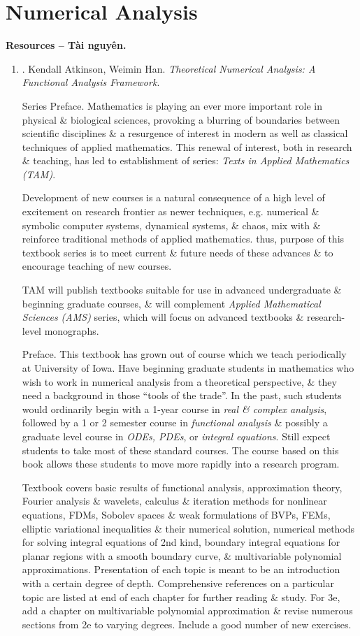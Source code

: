 \documentclass{article}
\begin{document}
\section{Numerical Analysis}
\textbf{\textsf{Resources -- Tài nguyên.}}
\begin{enumerate}
	\item \cite{Atkinson_Han2009}. {\sc Kendall Atkinson, Weimin Han}. {\it Theoretical Numerical Analysis: A Functional Analysis Framework}.
	
	{\sf Series Preface.} Mathematics is playing an ever more important role in physical \& biological sciences, provoking a blurring of boundaries between scientific disciplines \& a resurgence of interest in modern as well as classical techniques of applied mathematics. This renewal of interest, both in research \& teaching, has led to establishment of series: {\it Texts in Applied Mathematics (TAM)}.
	
	Development of new courses is a natural consequence of a high level of excitement on research frontier as newer techniques, e.g. numerical \& symbolic computer systems, dynamical systems, \& chaos, mix with \& reinforce traditional methods of applied mathematics. thus, purpose of this textbook series is to meet current \& future needs of these advances \& to encourage teaching of new courses.
	
	TAM will publish textbooks suitable for use in advanced undergraduate \& beginning graduate courses, \& will complement {\it Applied Mathematical Sciences (AMS)} series, which will focus on advanced textbooks \& research-level monographs.
	
	{\sf Preface.} This textbook has grown out of course which we teach periodically at University of Iowa. Have beginning graduate students in mathematics who wish to work in numerical analysis from a theoretical perspective, \& they need a background in those ``tools of the trade''. In the past, such students would ordinarily begin with a 1-year course in {\it real \& complex analysis}, followed by a 1 or 2 semester course in {\it functional analysis} \& possibly a graduate  level course in {\it ODEs, PDEs}, or {\it integral equations}. Still expect students to take most of these standard courses. The course based on this book allows these students to move more rapidly into a research program.
	
	Textbook covers basic results of functional analysis, approximation theory, Fourier analysis \& wavelets, calculus \& iteration methods for nonlinear equations, FDMs, Sobolev spaces \& weak formulations of BVPs, FEMs, elliptic variational inequalities \& their numerical solution, numerical methods for solving integral equations of 2nd kind, boundary integral equations for planar regions with a smooth boundary curve, \& multivariable polynomial approximations. Presentation of each topic is meant to be an introduction with a certain degree of depth. Comprehensive references on a particular topic are listed at end of each chapter for further reading \& study. For 3e, add a chapter on multivariable polynomial approximation \& revise numerous sections from 2e to varying degrees. Include a good number of new exercises.
	

\end{enumerate}
\end{document}
